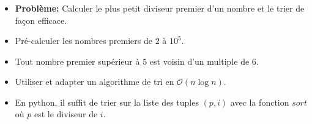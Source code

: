 \begin{frame}
    \frametitle{\problemtitle}
    \begin{itemize}
        \item<+-> \textbf{Problème:} Calculer le plus petit diviseur premier d'un nombre et le trier de façon efficace.
        \item<+-> Pré-calculer les nombres premiers de $2$ à $10^5$.
        \item<+-> Tout nombre premier supérieur à $5$ est voisin d'un multiple de $6$.
        \item<+-> Utiliser et adapter un algorithme de tri en $\mathcal{O}(n\log n)$.
        \item<+-> En python, il suffit de trier sur la liste des tuples $(p, i)$ avec la fonction $sort$ où $p$ est le diviseur de $i$.

    \end{itemize}
\end{frame}
